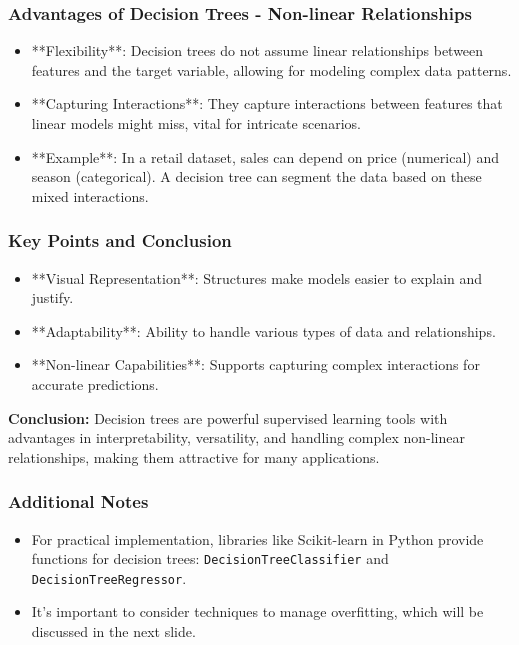 \documentclass[aspectratio=169]{beamer}
\begin{document}
\begin{frame}[fragile]
    \frametitle{Advantages of Decision Trees - Non-linear Relationships}
    \begin{itemize}
        \item **Flexibility**: 
            Decision trees do not assume linear relationships between features and the target variable, allowing for modeling complex data patterns.
        
        \item **Capturing Interactions**: 
            They capture interactions between features that linear models might miss, vital for intricate scenarios.
        
        \item **Example**:
            In a retail dataset, sales can depend on price (numerical) and season (categorical). A decision tree can segment the data based on these mixed interactions.
    \end{itemize}
\end{frame}

\begin{frame}[fragile]
    \frametitle{Key Points and Conclusion}
    \begin{itemize}
        \item **Visual Representation**: 
            Structures make models easier to explain and justify.
        
        \item **Adaptability**: 
            Ability to handle various types of data and relationships.
        
        \item **Non-linear Capabilities**: 
            Supports capturing complex interactions for accurate predictions.
    \end{itemize}
    
    \textbf{Conclusion:} Decision trees are powerful supervised learning tools with advantages in interpretability, versatility, and handling complex non-linear relationships, making them attractive for many applications.
\end{frame}

\begin{frame}[fragile]
    \frametitle{Additional Notes}
    \begin{itemize}
        \item For practical implementation, libraries like Scikit-learn in Python provide functions for decision trees: 
            \texttt{DecisionTreeClassifier} and \texttt{DecisionTreeRegressor}.
        \item It's important to consider techniques to manage overfitting, which will be discussed in the next slide.
    \end{itemize}
\end{frame}
\end{document}

